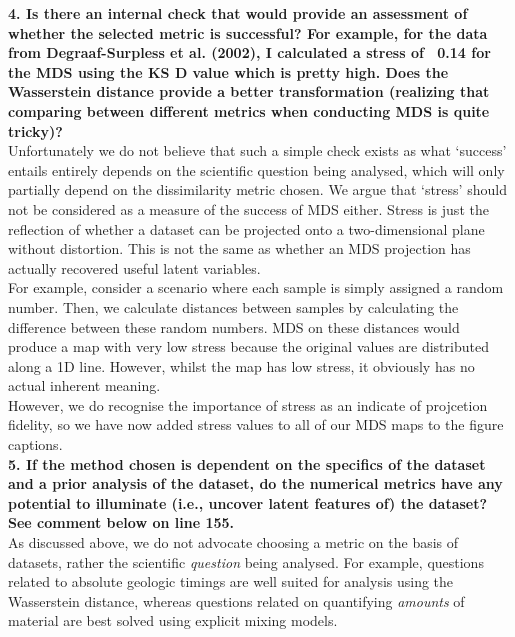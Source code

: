 \documentclass{article}[12p,a4paper]
\begin{document}
\textbf{4. Is there an internal check that would provide an assessment of whether the selected metric is successful? For example, for the data from Degraaf-Surpless et al. (2002), I calculated a stress of ~0.14 for the MDS using the KS D value which is pretty high. Does the Wasserstein distance provide a better transformation (realizing that comparing between different metrics when conducting MDS is quite tricky)?}\\

Unfortunately we do not believe that such a simple check exists as what `success' entails entirely depends on the scientific question being analysed, which will only partially depend on the dissimilarity metric chosen. We argue that `stress' should not be considered as a measure of the success of MDS either. Stress is just the reflection of whether a dataset can be projected onto a two-dimensional plane without distortion. This is not the same as whether an MDS projection has actually recovered useful latent variables.\\

For example, consider a scenario where each sample is simply assigned a random number. Then, we calculate distances between samples by calculating the difference between these random numbers. MDS on these distances would produce a map with very low stress because the original values are distributed along a 1D line. However, whilst the map has low stress, it obviously has no actual inherent meaning. \\

However, we do recognise the importance of stress as an indicate of projcetion fidelity, so we have now added stress values to all of our MDS maps to the figure captions. \\ 

\textbf{5. If the method chosen is dependent on the specifics of the dataset and a prior analysis of the dataset, do the numerical metrics have any potential to illuminate (i.e., uncover latent features of) the dataset? See comment below on line 155.}\\

As discussed above, we do not advocate choosing a metric on the basis of datasets, rather the scientific \textit{question} being analysed. For example, questions related to absolute geologic timings are well suited for analysis using the Wasserstein distance, whereas questions related on quantifying \textit{amounts} of material are best solved using explicit mixing models. \\ 
\end{document}
